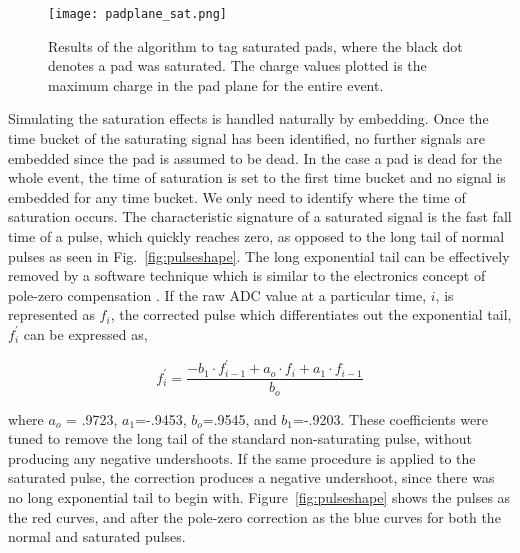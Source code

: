 \begin{figure}[!htb]
\texttt{[image: padplane\_sat.png]}
\caption{Results of the algorithm to tag saturated pads, where the black dot denotes a pad was saturated. The charge values plotted is the maximum charge in the pad plane for the entire event.}
\label{fig:satTag}
\end{figure}

Simulating the saturation effects is handled naturally by embedding. Once the time bucket of the saturating signal has been identified, no further signals are embedded since the pad is assumed to be dead. In the case a pad is dead for the whole event, the time of saturation is set to the first time bucket and no signal is embedded for any time bucket. We only need to identify where the time of saturation occurs. The characteristic signature of a saturated signal is the fast fall time of a pulse, which quickly reaches zero, as opposed to the long tail of normal pulses as seen in Fig.~\ref{fig:pulseshape}. The long exponential tail can be effectively removed by a software technique which is similar to the electronics concept of pole-zero compensation \cite{polezero}. If the raw ADC value at a particular time, $i$, is represented as $f_i$, the corrected pulse which differentiates out the exponential tail, $f_i^{'}$ can be expressed as, 

\begin{equation}
f_i^{'} = \frac{-b_1\cdot f_{i-1}^{'} + a_o\cdot f_i + a_1 \cdot f_{i-1}}{b_o}
\label{eq:satpolez}
\end{equation}

where $a_o$ = .9723, $a_1$=-.9453, $b_o$=.9545, and $b_1$=-.9203. These coefficients were tuned to remove the long tail of the standard non-saturating pulse, without producing any negative undershoots. If the same procedure is applied to the saturated pulse, the correction produces a negative undershoot, since there was no long exponential tail to begin with. Figure~\ref{fig:pulseshape} shows the pulses as the red curves, and after the pole-zero correction as the blue curves for both the normal and saturated pulses. 

